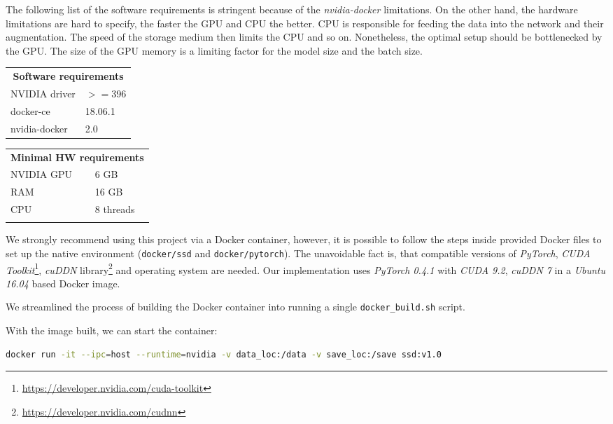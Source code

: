The following list of the software requirements is stringent because of the \textit{nvidia-docker} limitations. On the other hand, the hardware limitations are hard to specify, the faster the GPU and CPU the better. CPU is responsible for feeding the data into the network and their augmentation. The speed of the storage medium then limits the CPU and so on. Nonetheless, the optimal setup should be bottlenecked by the GPU. The size of the GPU memory is a limiting factor for the model size and the batch size.

\begin{multicols}{2}
\begin{tabular}{l l}
    \multicolumn{2}{c}{\textbf{Software requirements}} \\
    NVIDIA driver & $>=$396\\
    docker-ce & 18.06.1 \\
    nvidia-docker & 2.0 \\
\end{tabular}

\begin{tabular}{l l}
    \multicolumn{2}{c}{\textbf{Minimal HW requirements}} \\
    NVIDIA GPU & 6 GB  \\
    RAM & 16 GB\\
    CPU & 8 threads \\
     \\
\end{tabular}
\end{multicols}

We strongly recommend using this project via a Docker container, however, it is possible to follow the steps inside provided Docker files to set up the native environment ({\tt docker/ssd} and {\tt docker/pytorch}). The unavoidable fact is, that compatible versions of \textit{PyTorch}, \textit{CUDA Toolkit}\footnote{\url{https://developer.nvidia.com/cuda-toolkit}}, \textit{cuDDN} library\footnote{\url{https://developer.nvidia.com/cudnn}} and operating system are needed. Our implementation uses \textit{PyTorch 0.4.1} with \textit{CUDA 9.2}, \textit{cuDDN 7} in a \textit{Ubuntu 16.04} based Docker image.

We streamlined the process of building the Docker container into running a single {\tt docker\_build.sh} script. 

With the image built, we can start the container:

\begin{lstlisting}[breaklines, frame=single, language=Bash, basicstyle=\ttfamily]
  docker run -it --ipc=host --runtime=nvidia -v data_loc:/data -v save_loc:/save ssd:v1.0
\end{lstlisting}

